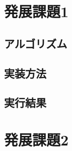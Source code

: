 \documentclass[dvipdfmx]{jarticle}
\begin{document}
\section{発展課題1}
\subsection{アルゴリズム}

\subsection{実装方法}

\subsection{実行結果}

\section{発展課題2}
\end{document}
